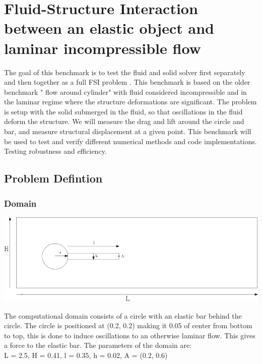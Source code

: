 \section{Fluid-Structure Interaction between an elastic object and laminar incompressible flow} \label{sec:HronTurek}
The goal of this benchmark is to test the fluid and solid solver first separately and then together as a full FSI problem \cite{Hron2006a}. This benchmark is based on the older benchmark " flow around cylinder" with fluid considered incompressible and in the laminar regime where the structure deformations are significant. The problem is setup with the solid submerged in the fluid, so that oscillations in the fluid deform the structure. We will measure the drag and lift around the circle and bar, and measure structural displacement at a given point. This benchmark will be used to test and verify different numerical methods and code implementations. Testing robustness and efficiency. 


\subsection{Problem Defintion}
\subsubsection*{Domain}

\begin{center}
\includegraphics[scale=0.4]{./Verification_Validation/Hron_Turek/Domain_drawing.png}
\end{center}

The computational domain consists of a circle with an elastic bar behind the circle. The circle is positioned at (0.2, 0.2) making it 0.05 of center from bottom to top, this is done to induce oscillations to an otherwise laminar flow. 
This gives a force to the elastic bar. The parameters of the domain are:\\
L = 2.5, H = 0.41, l = 0.35, h = 0.02, A = (0.2, 0.6) \\

